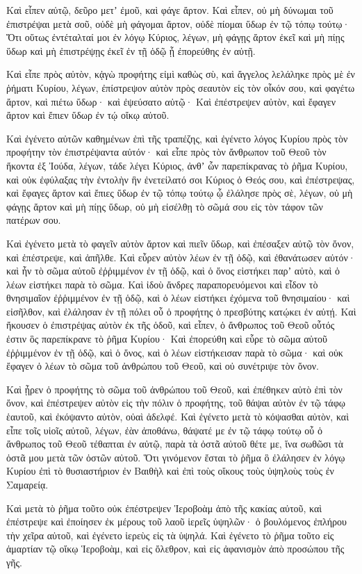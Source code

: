 {Καὶ εἶπεν αὐτῷ, δεῦρο μετʼ ἐμοῦ, καὶ φάγε ἄρτον.
Καὶ εἶπεν, οὐ μὴ δύνωμαι τοῦ ἐπιστρέψαι μετὰ σοῦ, οὐδὲ μὴ φάγομαι ἄρτον, οὐδὲ πίομαι ὕδωρ ἐν τῷ τόπῳ τούτῳ·
Ὅτι οὕτως ἐντέταλταί μοι ἐν λόγῳ Κύριος, λέγων, μὴ φάγῃς ἄρτον ἐκεῖ καὶ μὴ πίῃς ὕδωρ καὶ μὴ ἐπιστρέψῃς ἐκεῖ ἐν τῇ ὁδῷ ᾗ ἐπορεύθης ἐν αὐτῇ.
\par }{\PP {}Καὶ εἶπε πρὸς αὐτὸν, κᾀγὼ προφήτης εἰμὶ καθὼς σὺ, καὶ ἄγγελος λελάληκε πρὸς μὲ ἐν ῥήματι Κυρίου, λέγων, ἐπίστρεψον αὐτὸν πρὸς σεαυτὸν εἰς τὸν οἶκόν σου, καὶ φαγέτω ἄρτον, καὶ πιέτω ὕδωρ· καὶ ἐψεύσατο αὐτῷ·
Καὶ ἐπέστρεψεν αὐτὸν, καὶ ἔφαγεν ἄρτον καὶ ἔπιεν ὕδωρ ἐν τῴ οἴκῳ αὐτοῦ.
\par }{\PP {}Καὶ ἐγένετο αὐτῶν καθημένων ἐπὶ τῆς τραπέζης, καὶ ἐγένετο λόγος Κυρίου πρὸς τὸν προφήτην τὸν ἐπιστρέψαντα αὐτόν·
καὶ εἶπε πρὸς τὸν ἄνθρωπον τοῦ Θεοῦ τὸν ἥκοντα ἐξ Ἰούδα, λέγων, τάδε λέγει Κύριος, ἀνθʼ ὧν παρεπίκρανας τὸ ῥῆμα Κυρίου, καὶ οὐκ ἐφύλαξας τὴν ἐντολὴν ἣν ἐνετείλατό σοι Κύριος ὁ Θεός σου,
καὶ ἐπέστρεψας, καὶ ἔφαγες ἄρτον καὶ ἔπιες ὕδωρ ἐν τῷ τόπῳ τούτῳ ᾧ ἐλάλησε πρὸς σὲ, λέγων, οὐ μὴ φάγῃς ἄρτον καὶ μὴ πίῃς ὕδωρ, οὐ μὴ εἰσέλθῃ τὸ σῶμά σου εἰς τὸν τάφον τῶν πατέρων σου.
\par }{\PP {}Καὶ ἐγένετο μετὰ τὸ φαγεῖν αὐτὸν ἄρτον καὶ πιεῖν ὕδωρ, καὶ ἐπέσαξεν αὐτῷ τὸν ὄνον, καὶ ἐπέστρεψε, καὶ ἀπῆλθε.
Καὶ εὗρεν αὐτὸν λέων ἐν τῇ ὁδῷ, καὶ ἐθανάτωσεν αὐτόν· καὶ ἦν τὸ σῶμα αὐτοῦ ἐῤῥιμμένον ἐν τῇ ὁδῷ, καὶ ὁ ὄνος εἱστήκει παρʼ αὐτὸ, καὶ ὁ λέων εἱστήκει παρὰ τὸ σῶμα.
Καὶ ἰδοὺ ἄνδρες παραπορευόμενοι καὶ εἶδον τὸ θνησιμαῖον ἐῤῥιμμένον ἐν τῇ ὁδῷ, καὶ ὁ λέων εἱστήκει ἐχόμενα τοῦ θνησιμαίου· καὶ εἰσῆλθον, καὶ ἐλάλησαν ἐν τῇ πόλει οὗ ὁ προφήτης ὁ πρεσβύτης κατῴκει ἐν αὐτῄ.
Καὶ ἤκουσεν ὁ ἐπιστρέψας αὐτὸν ἐκ τῆς ὁδοῦ, καὶ εἶπεν, ὁ ἄνθρωπος τοῦ Θεοῦ οὗτός ἐστιν ὃς παρεπίκρανε τὸ ῥῆμα Κυρίου·
Καὶ ἐπορεύθη καὶ εὗρε τὸ σῶμα αὐτοῦ ἐῤῥιμμένον ἐν τῇ ὁδῷ, καὶ ὁ ὄνος, καὶ ὁ λέων εἱστήκεισαν παρὰ τὸ σῶμα· καὶ οὐκ ἔφαγεν ὁ λέων τὸ σῶμα τοῦ ἀνθρώπου τοῦ Θεοῦ, καὶ οὐ συνέτριψε τὸν ὄνον.
\par }{\PP {}Καὶ ᾖρεν ὁ προφήτης τὸ σῶμα τοῦ ἀνθρώπου τοῦ Θεοῦ, καὶ ἐπέθηκεν αὐτὸ ἐπὶ τὸν ὄνον, καὶ ἐπέστρεψεν αὐτὸν εἰς τὴν πόλιν
ὁ προφήτης, τοῦ θάψαι αὐτὸν ἐν τῷ τάφῳ ἑαυτοῦ, καὶ ἐκόψαντο αὐτὸν, οὐαὶ ἀδελφέ.
Καὶ ἐγένετο μετὰ τὸ κόψασθαι αὐτὸν, καὶ εἶπε τοῖς υἱοῖς αὐτοῦ, λέγων, ἐὰν ἀποθάνω, θάψατέ με ἐν τῷ τάφῳ τούτῳ οὗ ὁ ἄνθρωπος τοῦ Θεοῦ τέθαπται ἐν αὐτῷ, παρὰ τὰ ὀστᾶ αὐτοῦ θέτε με, ἵνα σωθῶσι τὰ ὀστᾶ μου μετὰ τῶν ὀστῶν αὐτοῦ.
Ὅτι γινόμενον ἔσται τὸ ῥῆμα ὃ ἐλάλησεν ἐν λόγῳ Κυρίου ἐπὶ τὸ θυσιαστήριον ἐν Βαιθὴλ καὶ ἐπὶ τοὺς οἴκους τοὺς ὑψηλοὺς τοὺς ἐν Σαμαρείᾳ.
\par }{\PP {}Καὶ μετὰ τὸ ῥῆμα τοῦτο οὐκ ἐπέστρεψεν Ἱεροβοὰμ ἀπὸ τῆς κακίας αὐτοῦ, καὶ ἐπέστρεψε καὶ ἐποίησεν ἐκ μέρους τοῦ λαοῦ ἱερεῖς ὑψηλῶν· ὁ βουλόμενος ἐπλήρου τὴν χεῖρα αὐτοῦ, καὶ ἐγένετο ἱερεὺς εἰς τὰ ὑψηλά.
Καὶ ἐγένετο τὸ ῥῆμα τοῦτο εἰς ἁμαρτίαν τῷ οἴκῳ Ἱεροβοὰμ, καὶ εἰς ὄλεθρον, καὶ εἰς ἀφανισμὸν ἀπὸ προσώπου τῆς γῆς.

}
